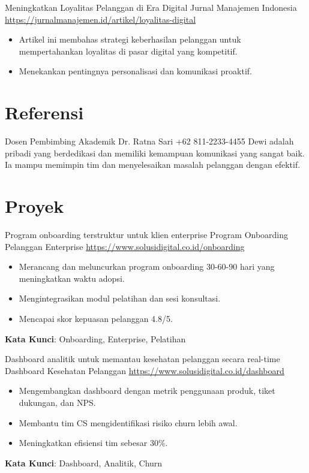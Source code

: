 \documentclass[a4paper, serif, 10pt]{moderncv}
\begin{document}
        {Meningkatkan Loyalitas Pelanggan di Era Digital}
        {Jurnal Manajemen Indonesia}
        {\url{https://jurnalmanajemen.id/artikel/loyalitas-digital}}
        {}
        {\begin{itemize}
\item Artikel ini membahas strategi keberhasilan pelanggan untuk mempertahankan loyalitas di pasar digital yang kompetitif.
\item Menekankan pentingnya personalisasi dan komunikasi proaktif.
\end{itemize}}
\section{Referensi}

        {Dosen Pembimbing Akademik}
        {Dr. Ratna Sari}
        {+62 811-2233-4455}
        {}
        {Dewi adalah pribadi yang berdedikasi dan memiliki kemampuan komunikasi yang sangat baik. Ia mampu memimpin tim dan menyelesaikan masalah pelanggan dengan efektif.}
\section{Proyek}

        {Program onboarding terstruktur untuk klien enterprise}
        {Program Onboarding Pelanggan Enterprise}
        {\url{https://www.solusidigital.co.id/onboarding}}
        {}
        {\begin{itemize}
\item Merancang dan meluncurkan program onboarding 30-60-90 hari yang meningkatkan waktu adopsi.
\item Mengintegrasikan modul pelatihan dan sesi konsultasi.
\item Mencapai skor kepuasan pelanggan 4.8/5.
\end{itemize}
\textbf{Kata Kunci}: Onboarding, Enterprise, Pelatihan}

        {Dashboard analitik untuk memantau kesehatan pelanggan secara real-time}
        {Dashboard Kesehatan Pelanggan}
        {\url{https://www.solusidigital.co.id/dashboard}}
        {}
        {\begin{itemize}
\item Mengembangkan dashboard dengan metrik penggunaan produk, tiket dukungan, dan NPS.
\item Membantu tim CS mengidentifikasi risiko churn lebih awal.
\item Meningkatkan efisiensi tim sebesar 30\%.
\end{itemize}
\textbf{Kata Kunci}: Dashboard, Analitik, Churn}
\end{document}
